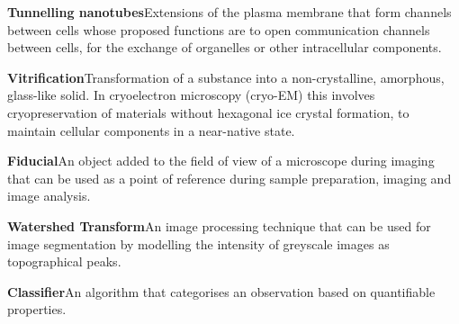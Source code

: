 \documentclass{article}
\begin{document}
\begin{hangpars}
\textbf{Tunnelling nanotubes}\quad Extensions of the plasma membrane that form channels between cells whose proposed functions are to open communication channels between cells, for the exchange of organelles or other intracellular components.

\textbf{Vitrification}\quad Transformation of a substance into a non-crystalline, amorphous, glass-like solid. In cryoelectron microscopy (cryo-EM) this involves cryopreservation of materials without hexagonal ice crystal formation, to maintain cellular components in a near-native state.

\textbf{Fiducial}\quad An object added to the field of view of a microscope during imaging that can be used as a point of reference during sample preparation, imaging and image analysis.

\textbf{Watershed Transform}\quad An image processing technique that can be used for image segmentation by modelling the intensity of greyscale images as topographical peaks.

\textbf{Classifier}\quad An algorithm that categorises an observation based on quantifiable properties.


\begin{hangpars}
\end{hangpars}
\end{hangpars}
\end{document}
